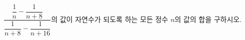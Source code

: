 \hspace*{2mm}\begin{minipage}[t]{\dimexpr\linewidth-2mm\relax}\vspace{0pt}
$\dfrac{\dfrac{1}{n}-\dfrac{1}{n+8}}{\dfrac{1}{n+8}-\dfrac{1}{n+16}}$의 값이 자연수가 되도록 하는 모든 정수 $n$의 값의 합을 구하시오.\end{minipage}
